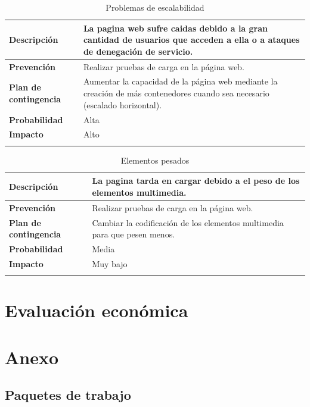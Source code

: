 \documentclass{report}
\begin{document}
        \begin{center}
            \begin{longtable}{|p{6cm}|p{6cm}|}
                \hline
                \textbf{Descripción} & La pagina web sufre caidas debido a la gran cantidad de usuarios que acceden a ella o a ataques de denegación de servicio.\\
                \hline
                \textbf{Prevención} & Realizar pruebas de carga en la página web.\\
                \hline
                \textbf{Plan de contingencia} & Aumentar la capacidad de la página web mediante la creación de más contenedores cuando sea necesario (escalado horizontal).\\
                \hline
                \textbf{Probabilidad} & Alta\\
                \hline
                \textbf{Impacto} & Alto\\
                \hline
                \caption{Problemas de escalabilidad}
            \end{longtable}
        \end{center}
        \begin{center}
            \begin{longtable}{|p{6cm}|p{6cm}|}
                \hline
                \textbf{Descripción} & La pagina tarda en cargar debido a el peso de los elementos multimedia.\\
                \hline
                \textbf{Prevención} & Realizar pruebas de carga en la página web.\\
                \hline
                \textbf{Plan de contingencia} & Cambiar la codificación de los elementos multimedia para que pesen menos.\\
                \hline
                \textbf{Probabilidad} & Media\\
                \hline
                \textbf{Impacto} & Muy bajo\\
                \hline
                \caption{Elementos pesados}
            \end{longtable}
        \end{center}
    \chapter{Evaluación económica} %
    \chapter*{Anexo} %
        \section*{Paquetes de trabajo} %
\end{document}
